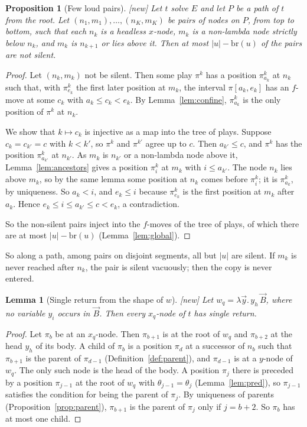 \documentclass[11pt]{article}
\newcommand{\br}{\mathrm{br}}
\newcommand{\iv}[2]{\pi[#1,#2]}
\newcommand{\New}{\textsf{[new]}}
\theoremstyle{plain}
\newtheorem{proposition}[theorem]{Proposition}
\newtheorem{lemma}[theorem]{Lemma}
\theoremstyle{definition}
\theoremstyle{remark}
\begin{document}
\begin{proposition}[Few loud pairs]\label{prop:loud}
\New{} Let $t$ solve $E$ and let $P$ be a path of $t$ from the root.
Let $(n_1,m_1),\dots,(n_K,m_K)$ be pairs of nodes on $P$, from top to
bottom, such that each $n_k$ is a headless $x$-node, $m_k$ is a
non-lambda node strictly below $n_k$, and $m_k$ is $n_{k+1}$ or lies
above it.  Then at most $|u|-\br(u)$ of the pairs are not silent.
\end{proposition}
\begin{proof}
Let $(n_k,m_k)$ not be silent.  Then some play $\pi^k$ has a position
$\pi^k_{a_k}$ at $n_k$ such that, with $\pi^k_{e_k}$ the first later
position at $m_k$, the interval $\iv{a_k}{e_k}$ has an $f$-move at some
$c_k$ with $a_k\le c_k<e_k$.  By Lemma~\ref{lem:confine}, $\pi^k_{a_k}$
is the only position of $\pi^k$ at $n_k$.

We show that $k\mapsto c_k$ is injective as a map into the tree of
plays.  Suppose $c_k=c_{k'}=c$ with $k<k'$, so $\pi^k$ and $\pi^{k'}$
agree up to $c$.  Then $a_{k'}\le c$, and $\pi^k$ has the position
$\pi^k_{a_{k'}}$ at $n_{k'}$.  As $m_k$ is $n_{k'}$ or a non-lambda node
above it, Lemma~\ref{lem:ancestors} gives a position $\pi^k_i$ at $m_k$
with $i\le a_{k'}$.  The node $n_k$ lies above $m_k$, so by the same
lemma some position at $n_k$ comes before $\pi^k_i$; it is
$\pi^k_{a_k}$, by uniqueness.  So $a_k<i$, and $e_k\le i$ because
$\pi^k_{e_k}$ is the first position at $m_k$ after $a_k$.  Hence
$e_k\le i\le a_{k'}\le c<e_k$, a contradiction.

So the non-silent pairs inject into the $f$-moves of the tree of plays,
of which there are at most $|u|-\br(u)$ (Lemma~\ref{lem:global}).
\end{proof}

So along a path, among pairs on disjoint segments, all but $|u|$ are
silent.  If $m_k$ is never reached after $n_k$, the pair is silent
vacuously; then the copy is never entered.

\begin{lemma}[Single return from the shape of $w$]\label{lem:staticsr}
\New{} Let $w_q=\lambda\vec y.\,y_h\,\vec B$, where no variable $y_i$
occurs in $\vec B$.  Then every $x_q$-node of $t$ has single return.
\end{lemma}
\begin{proof}
Let $\pi_b$ be at an $x_q$-node.  Then $\pi_{b+1}$ is at the root of
$w_q$ and $\pi_{b+2}$ at the head $y_h$ of its body.  A child of
$\pi_b$ is a position $\pi_d$ at a successor of $n_b$ such that
$\pi_{b+1}$ is the parent of $\pi_{d-1}$ (Definition~\ref{def:parent}),
and $\pi_{d-1}$ is at a $y$-node of $w_q$.  The only such node is the
head of the body.  A position $\pi_j$ there is preceded by a position
$\pi_{j-1}$ at the root of $w_q$ with $\theta_{j-1}=\theta_j$
(Lemma~\ref{lem:pred}), so $\pi_{j-1}$ satisfies the condition for
being the parent of $\pi_j$.  By uniqueness of parents
(Proposition~\ref{prop:parent}), $\pi_{b+1}$ is the parent of $\pi_j$
only if $j=b+2$.  So $\pi_b$ has at most one child.
\end{proof}
\end{document}
